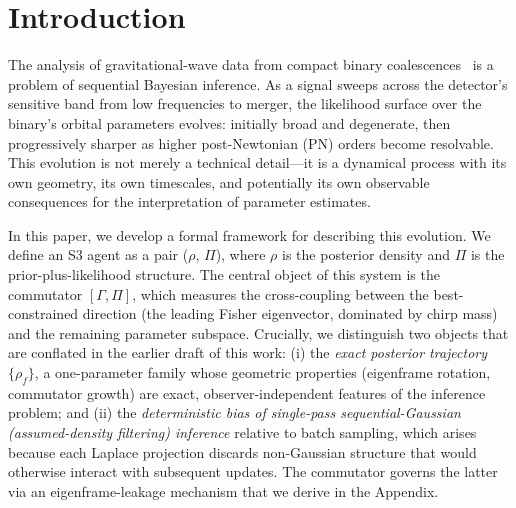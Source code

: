 \documentclass[twocolumn,prd,showpacs,superscriptaddress]{revtex4-2}
\newcommand{\manifest}[1]{\textbf{[#1]}}
\begin{document}
\begin{abstract}
The systematic offset formula
$\Delta\theta_{\text{sys}} \approx \Gamma(f_{\text{max}})^{-1}
\int [\Gamma(f'), \Pi(f')]\,df' \cdot v_{\perp}$
is reframed as the bias of single-pass sequential-Gaussian filtering
relative to exact batch inference, with the commutator governing how
approximation error leaks into the degeneracy direction.  A dual-PSD
Fisher sweep shows the commutator integral is PSD-insensitive at the
$\sim\!1\%$ level (ratio $\manifest{T8: dual-PSD ratio}$),
confirming that the bias formula's inputs are detector-universal.
The decisive test---an in-software comparison of batch, sequential-forward,
and permuted-order inference on a single injection---is described;
it replaces the previously proposed multi-detector comparison, which
is shown to be unperformable given the $\sim\!1\%$ effect size and
coherent-network PE design.
\end{abstract}

\maketitle

\section{Introduction}
\label{sec:intro}

The analysis of gravitational-wave data from compact binary
coalescences~\cite{maggiore2007gw} is a problem of sequential Bayesian
inference.  As a signal sweeps across the detector's sensitive band
from low frequencies to merger, the likelihood surface over the
binary's orbital parameters evolves: initially broad and degenerate,
then progressively sharper as higher post-Newtonian (PN) orders become
resolvable.  This evolution is not merely a technical detail---it is a
dynamical process with its own geometry, its own timescales, and
potentially its own observable consequences for the interpretation of
parameter estimates.

In this paper, we develop a formal framework for describing this
evolution.  We define an S3 agent as a pair ($\rho$, $\Pi$), where
$\rho$ is the posterior density and $\Pi$ is the prior-plus-likelihood
structure.  The central object of this system is the commutator
$[\Gamma, \Pi]$, which measures the cross-coupling between the
best-constrained direction (the leading Fisher eigenvector, dominated
by chirp mass) and the remaining parameter subspace.  Crucially, we
distinguish two objects that are conflated in the earlier draft of
this work: (i) the \emph{exact posterior trajectory}
$\{\rho_f\}$, a one-parameter family whose geometric properties
(eigenframe rotation, commutator growth) are exact, observer-independent
features of the inference problem; and (ii) the \emph{deterministic
bias of single-pass sequential-Gaussian (assumed-density filtering)
inference} relative to batch sampling, which arises because each
Laplace projection discards non-Gaussian structure that would otherwise
interact with subsequent updates.  The commutator governs the latter
via an eigenframe-leakage mechanism that we derive in the Appendix.
\end{document}
